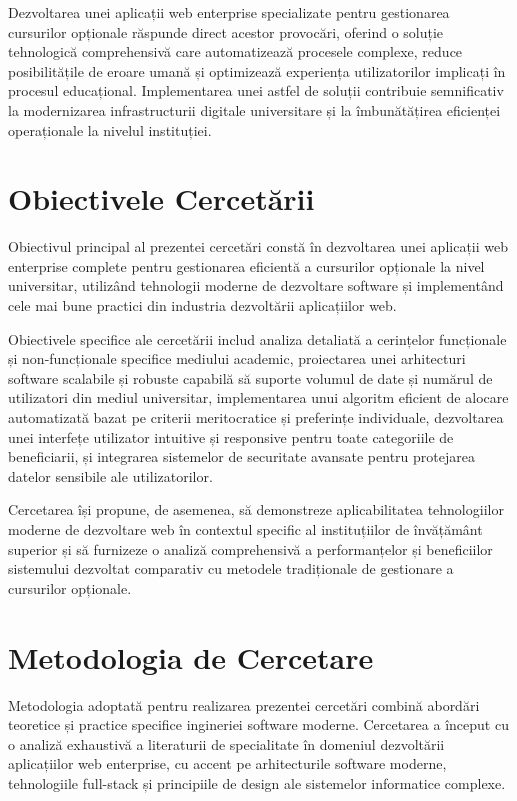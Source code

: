 \documentclass[12pt,a4paper]{report}
\begin{document}
Dezvoltarea unei aplicații web enterprise specializate pentru gestionarea cursurilor opționale răspunde direct acestor provocări, oferind o soluție tehnologică comprehensivă care automatizează procesele complexe, reduce posibilitățile de eroare umană și optimizează experiența utilizatorilor implicați în procesul educațional. Implementarea unei astfel de soluții contribuie semnificativ la modernizarea infrastructurii digitale universitare și la îmbunătățirea eficienței operaționale la nivelul instituției.

\section{Obiectivele Cercetării}

Obiectivul principal al prezentei cercetări constă în dezvoltarea unei aplicații web enterprise complete pentru gestionarea eficientă a cursurilor opționale la nivel universitar, utilizând tehnologii moderne de dezvoltare software și implementând cele mai bune practici din industria dezvoltării aplicațiilor web.

Obiectivele specifice ale cercetării includ analiza detaliată a cerințelor funcționale și non-funcționale specifice mediului academic, proiectarea unei arhitecturi software scalabile și robuste capabilă să suporte volumul de date și numărul de utilizatori din mediul universitar, implementarea unui algoritm eficient de alocare automatizată bazat pe criterii meritocratice și preferințe individuale, dezvoltarea unei interfețe utilizator intuitive și responsive pentru toate categoriile de beneficiarii, și integrarea sistemelor de securitate avansate pentru protejarea datelor sensibile ale utilizatorilor.

Cercetarea își propune, de asemenea, să demonstreze aplicabilitatea tehnologiilor moderne de dezvoltare web în contextul specific al instituțiilor de învățământ superior și să furnizeze o analiză comprehensivă a performanțelor și beneficiilor sistemului dezvoltat comparativ cu metodele tradiționale de gestionare a cursurilor opționale.

\section{Metodologia de Cercetare}

Metodologia adoptată pentru realizarea prezentei cercetări combină abordări teoretice și practice specifice ingineriei software moderne. Cercetarea a început cu o analiză exhaustivă a literaturii de specialitate în domeniul dezvoltării aplicațiilor web enterprise, cu accent pe arhitecturile software moderne, tehnologiile full-stack și principiile de design ale sistemelor informatice complexe.
\end{document}
